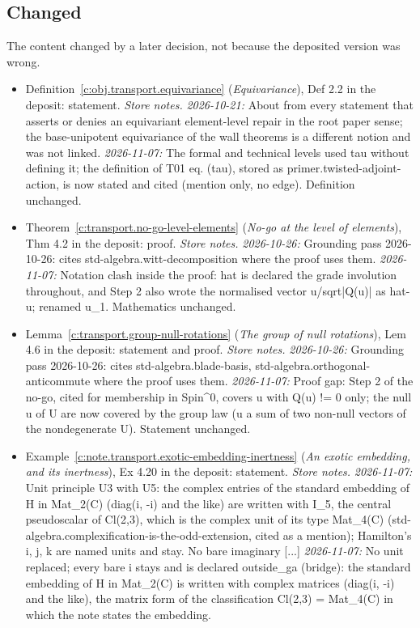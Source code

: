 \documentclass[11pt]{article}
\theoremstyle{definition}
\theoremstyle{plain}
\begin{document}
\subsection*{Changed}
The content changed by a later decision, not because the deposited version was wrong.
\begin{itemize}\setlength{\itemsep}{2pt}
\item Definition~\ref{c:obj.transport.equivariance} (\emph{Equivariance}), Def 2.2 in the deposit: statement. \emph{Store notes.} \emph{2026-10-21:} About from every statement that asserts or denies an equivariant element-level repair in the root paper sense; the base-unipotent equivariance of the wall theorems is a different notion and was not linked. \emph{2026-11-07:} The formal and technical levels used tau without defining it; the definition of T01 eq. (tau), stored as primer.twisted-adjoint-action, is now stated and cited (mention only, no edge). Definition unchanged.
\item Theorem~\ref{c:transport.no-go-level-elements} (\emph{No-go at the level of elements}), Thm 4.2 in the deposit: proof. \emph{Store notes.} \emph{2026-10-26:} Grounding pass 2026-10-26: cites std-algebra.witt-decomposition where the proof uses them. \emph{2026-11-07:} Notation clash inside the proof: hat is declared the grade involution throughout, and Step 2 also wrote the normalised vector u/sqrt|Q(u)| as hat-u; renamed u\_1. Mathematics unchanged.
\item Lemma~\ref{c:transport.group-null-rotations} (\emph{The group of null rotations}), Lem 4.6 in the deposit: statement and proof. \emph{Store notes.} \emph{2026-10-26:} Grounding pass 2026-10-26: cites std-algebra.blade-basis, std-algebra.orthogonal-anticommute where the proof uses them. \emph{2026-11-07:} Proof gap: Step 2 of the no-go, cited for membership in Spin\^{}0, covers u with Q(u) != 0 only; the null u of U are now covered by the group law (u a sum of two non-null vectors of the nondegenerate U). Statement unchanged.
\item Example~\ref{c:note.transport.exotic-embedding-inertness} (\emph{An exotic embedding, and its inertness}), Ex 4.20 in the deposit: statement. \emph{Store notes.} \emph{2026-11-07:} Unit principle U3 with U5: the complex entries of the standard embedding of H in Mat\_2(C) (diag(i, -i) and the like) are written with I\_5, the central pseudoscalar of Cl(2,3), which is the complex unit of its type Mat\_4(C) (std-algebra.complexification-is-the-odd-extension, cited as a mention); Hamilton's i, j, k are named units and stay. No bare imaginary [...] \emph{2026-11-07:} No unit replaced; every bare i stays and is declared outside\_ga (bridge): the standard embedding of H in Mat\_2(C) is written with complex matrices (diag(i, -i) and the like), the matrix form of the classification Cl(2,3) = Mat\_4(C) in which the note states the embedding.

\end{itemize}
\end{document}
